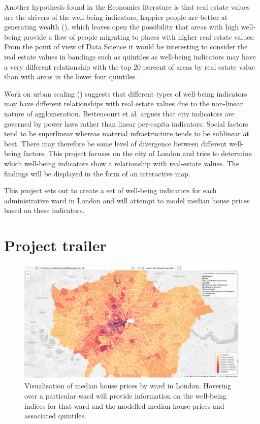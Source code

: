 Another hypothesis found in the Economics literature is that real estate values are the drivers of the well-being indicators, happier people are better at generating wealth (\cite {LKD05}), which leaves open the possibility that areas with high well-being provide a flow of people migrating to places with higher real estate values. From the point of view of Data Science it would be interesting to consider the real estate values in bandings such as quintiles as well-being indicators may have a very different relationship with the top 20 percent of areas by real estate value than with areas in the lower four quintiles.

Work on urban scaling (\cite {BLSW10}) suggests that different types of well-being indicators may have different relationships with real estate values due to the non-linear nature of agglomeration. Bettencourt et al. argues that city indicators are governed by power laws rather than linear per-capita indicators. Social factors tend to be superlinear whereas material infrastructure tends to be sublinear at best. There may therefore be some level of divergence between different well-being factors.
This project focuses on the city of London and tries to determine which well-being indicators show a relationship with real-estate values. The findings will be displayed in the form of an interactive map.

This project sets out to create a set of well-being indicators for each administrative ward in London and will attempt to model median house prices based on these indicators.



\section{Project trailer}

\begin{figure}[H]
\centering
\includegraphics[scale=0.3]{figures/trailer_1}
\decoRule
\caption{Visualisation of median house prices by ward in London. Hovering over a particular ward will provide information on the well-being indices for that ward and the modelled median house prices and associated quintiles.}
\end{figure}

